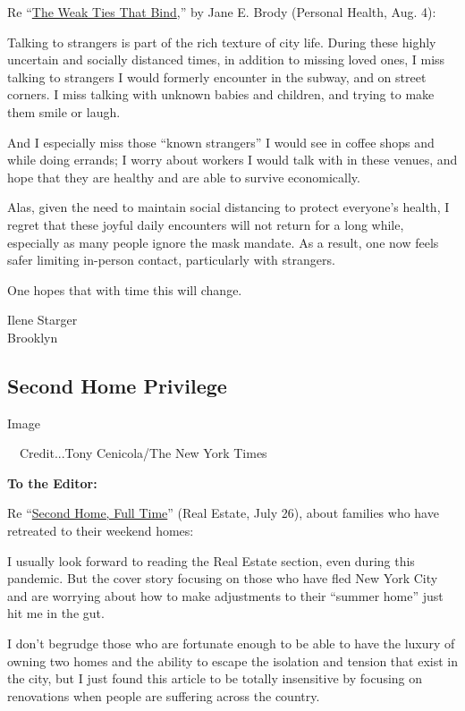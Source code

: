 Re
``\href{https://www.nytimes.com/2020/08/03/well/family/the-benefits-of-talking-to-strangers.html}{The
Weak Ties That Bind},'' by Jane E. Brody (Personal Health, Aug. 4):

Talking to strangers is part of the rich texture of city life. During
these highly uncertain and socially distanced times, in addition to
missing loved ones, I miss talking to strangers I would formerly
encounter in the subway, and on street corners. I miss talking with
unknown babies and children, and trying to make them smile or laugh.

And I especially miss those ``known strangers'' I would see in coffee
shops and while doing errands; I worry about workers I would talk with
in these venues, and hope that they are healthy and are able to survive
economically.

Alas, given the need to maintain social distancing to protect everyone's
health, I regret that these joyful daily encounters will not return for
a long while, especially as many people ignore the mask mandate. As a
result, one now feels safer limiting in-person contact, particularly
with strangers.

One hopes that with time this will change.

Ilene Starger\\
Brooklyn

\hypertarget{second-home-privilege}{%
\subsection{Second Home Privilege}\label{second-home-privilege}}

Image

~~Credit...Tony Cenicola/The New York Times

\textbf{To the Editor:}

Re
``\href{https://www.nytimes.com/2020/07/24/realestate/coronavirus-second-homes-.html}{Second
Home, Full Time}'' (Real Estate, July 26), about families who have
retreated to their weekend homes:

I usually look forward to reading the Real Estate section, even during
this pandemic. But the cover story focusing on those who have fled New
York City and are worrying about how to make adjustments to their
``summer home'' just hit me in the gut.

I don't begrudge those who are fortunate enough to be able to have the
luxury of owning two homes and the ability to escape the isolation and
tension that exist in the city, but I just found this article to be
totally insensitive by focusing on renovations when people are suffering
across the country.


